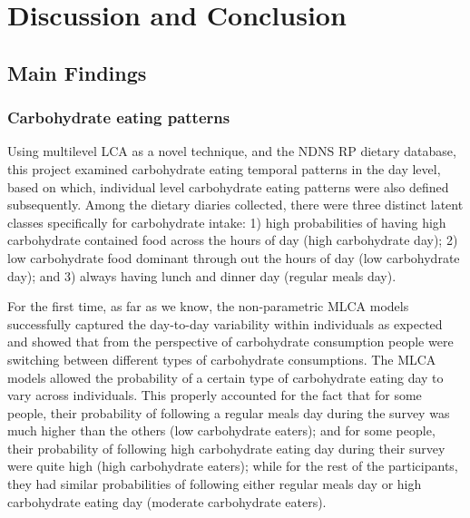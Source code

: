 
\chapter{Discussion and Conclusion} %

\label{Chapter 4} %






\section{Main Findings}

\subsection{Carbohydrate eating patterns}

Using multilevel LCA as a novel technique, and the NDNS RP dietary database, this project examined carbohydrate eating temporal patterns in the day level, based on which, individual level carbohydrate eating patterns were also defined subsequently. Among the dietary diaries collected, there were three distinct latent classes specifically for carbohydrate intake: 1) high probabilities of having high carbohydrate contained food across the hours of day (high carbohydrate day); 2) low carbohydrate food dominant through out the hours of day (low carbohydrate day); and 3) always having lunch and dinner day (regular meals day). 

For the first time, as far as we know, the non-parametric MLCA models successfully captured the day-to-day variability within individuals as expected and showed that from the perspective of carbohydrate consumption people were switching between different types of carbohydrate consumptions. The MLCA models allowed the probability of a certain type of carbohydrate eating day to vary across individuals. This properly accounted for the fact that for some people, their probability of following a regular meals day during the survey was much higher than the others (low carbohydrate eaters); and for some people, their probability of following high carbohydrate eating day during their survey were quite high (high carbohydrate eaters); while for the rest of the participants, they had similar probabilities of following either regular meals day or high carbohydrate eating day (moderate carbohydrate eaters). 

